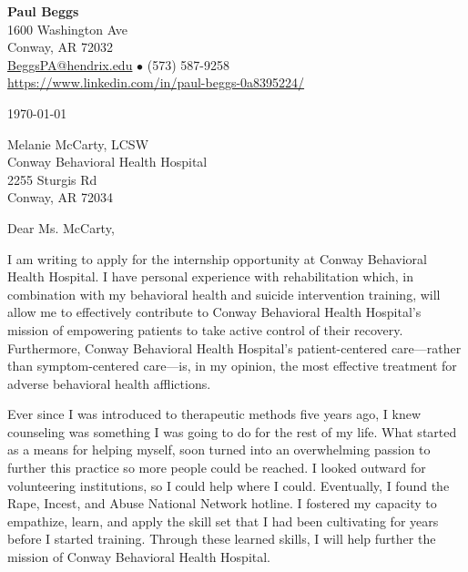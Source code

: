 \documentclass[11pt,letterpaper]{article}
\begin{document}
\begin{center}
    \LARGE \textbf{Paul Beggs} \\
    \vspace{0.2cm}
    \normalsize
    1600 Washington Ave \\
    Conway, AR 72032 \\
    \href{mailto:BeggsPA@hendrix.edu}{BeggsPA@hendrix.edu} \(\bullet\) (573) 587-9258 \\
    \url{https://www.linkedin.com/in/paul-beggs-0a8395224/}
\end{center}

\vspace{0.25cm}
\singlespacing




\today

Melanie McCarty, LCSW \\
Conway Behavioral Health Hospital \\
2255 Sturgis Rd \\
Conway, AR 72034

Dear Ms. McCarty,


I am writing to apply for the internship opportunity at Conway Behavioral Health Hospital. I have personal experience with rehabilitation which, in combination with my behavioral health and suicide intervention training, will allow me to effectively contribute to Conway Behavioral Health Hospital's mission of empowering patients to take active control of their recovery. Furthermore, Conway Behavioral Health Hospital's patient-centered care---rather than symptom-centered care---is, in my opinion, the most effective treatment for adverse behavioral health afflictions.



Ever since I was introduced to therapeutic methods five years ago, I knew counseling was something I was going to do for the rest of my life. What started as a means for helping myself, soon turned into an overwhelming passion to further this practice so more people could be reached. I looked outward for volunteering institutions, so I could help where I could. Eventually, I found the Rape, Incest, and Abuse National Network hotline. I fostered my capacity to empathize, learn, and apply the skill set that I had been cultivating for years before I started training. Through these learned skills, I will help further the mission of Conway Behavioral Health Hospital.
\end{document}
